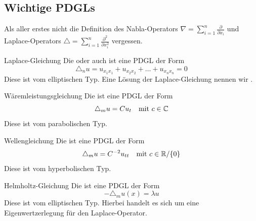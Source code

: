 \subsection{Wichtige PDGLs}
Als aller erstes nicht die Definition des Nabla-Operators $\nabla= \sum_{i=1}^n \frac{\partial}{\partial x_i}$ und Laplace-Operators $\triangle= \sum_{i=1}^n \frac{\partial^2}{\partial x_i^2}$ vergessen.
    \begin{Def}{Laplace-Gleichung}
    Die  oder auch  ist eine PDGL der Form
    $$\triangle_n u = u_{x_1x_1}+u_{x_2x_2}+\dots + u_{x_nx_n}=0$$
    Diese ist vom elliptischen Typ. Eine Lösung der Laplace-Gleichung nennen wir 
.        
    \end{Def}
    \begin{Def}{Wäremleistungsgleichung}
      Die  ist eine PDGL der Form
      $$\triangle_m u=Cu_t\quad \mbox{mit $c\in \mathbb{C}$}$$
      Diese ist vom parabolischen Typ.
    \end{Def}
\begin{Def}{Wellengleichung}
      Die  ist eine PDGL der Form
      $$\triangle_m u=C^{-2}u_{tt}\quad \mbox{mit $c\in \mathbb{R}/\{0\}$}$$
      Diese ist vom hyperbolischen Typ.
    \end{Def}
\begin{Def}{Helmholtz-Gleichung}
      Die  ist eine PDGL der Form
      $$-\triangle_m u(x)=\lambda u$$
      Diese ist vom elliptischen Typ. Hierbei handelt es sich um eine Eigenwertzerlegung für den Laplace-Operator.
    \end{Def}
